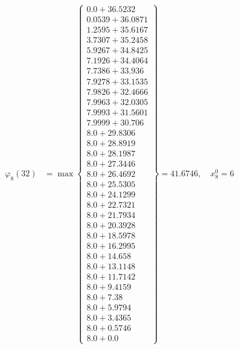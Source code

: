\documentclass{article}
\begin{document}
\begin{align*}
  
\varphi_{8}(32) &= \max \left\{ \begin{array}{c}
0.0 + 36.5232 \\
 0.0539 + 36.0871 \\
 1.2595 + 35.6167 \\
 3.7307 + 35.2458 \\
 5.9267 + 34.8425 \\
 7.1926 + 34.4064 \\
 7.7386 + 33.936 \\
 7.9278 + 33.1535 \\
 7.9826 + 32.4666 \\
 7.9963 + 32.0305 \\
 7.9993 + 31.5601 \\
 7.9999 + 30.706 \\
 8.0 + 29.8306 \\
 8.0 + 28.8919 \\
 8.0 + 28.1987 \\
 8.0 + 27.3446 \\
 8.0 + 26.4692 \\
 8.0 + 25.5305 \\
 8.0 + 24.1299 \\
 8.0 + 22.7321 \\
 8.0 + 21.7934 \\
 8.0 + 20.3928 \\
 8.0 + 18.5978 \\
 8.0 + 16.2995 \\
 8.0 + 14.658 \\
 8.0 + 13.1148 \\
 8.0 + 11.7142 \\
 8.0 + 9.4159 \\
 8.0 + 7.38 \\
 8.0 + 5.9794 \\
 8.0 + 3.4365 \\
 8.0 + 0.5746 \\
 8.0 + 0.0
\end{array} \right\}=41.6746,\quad x_{8}^0=6\\
  
  
  

\end{align*}
\end{document}
